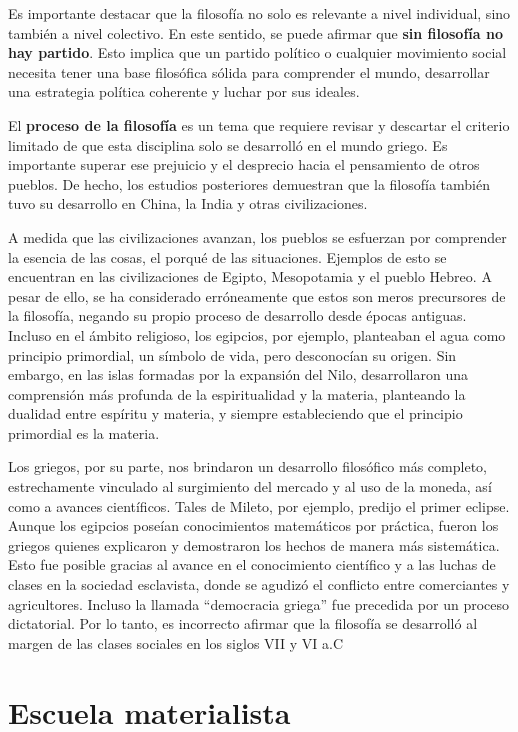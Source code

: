 \documentclass[
  jou,
  floatsintext,
  longtable,
  a4paper,
  nolmodern,
  notxfonts,
  notimes,
  12pt,
  colorlinks=true,linkcolor=blue,citecolor=blue,urlcolor=blue]{apa7}
\begin{document}
Es importante destacar que la filosofía no solo es relevante a nivel
individual, sino también a nivel colectivo. En este sentido, se puede
afirmar que \textbf{sin filosofía no hay partido}. Esto implica que un
partido político o cualquier movimiento social necesita tener una base
filosófica sólida para comprender el mundo, desarrollar una estrategia
política coherente y luchar por sus ideales.

El \textbf{proceso de la filosofía} es un tema que requiere revisar y
descartar el criterio limitado de que esta disciplina solo se desarrolló
en el mundo griego. Es importante superar ese prejuicio y el desprecio
hacia el pensamiento de otros pueblos. De hecho, los estudios
posteriores demuestran que la filosofía también tuvo su desarrollo en
China, la India y otras civilizaciones.

A medida que las civilizaciones avanzan, los pueblos se esfuerzan por
comprender la esencia de las cosas, el porqué de las situaciones.
Ejemplos de esto se encuentran en las civilizaciones de Egipto,
Mesopotamia y el pueblo Hebreo. A pesar de ello, se ha considerado
erróneamente que estos son meros precursores de la filosofía, negando su
propio proceso de desarrollo desde épocas antiguas. Incluso en el ámbito
religioso, los egipcios, por ejemplo, planteaban el agua como principio
primordial, un símbolo de vida, pero desconocían su origen. Sin embargo,
en las islas formadas por la expansión del Nilo, desarrollaron una
comprensión más profunda de la espiritualidad y la materia, planteando
la dualidad entre espíritu y materia, y siempre estableciendo que el
principio primordial es la materia.

Los griegos, por su parte, nos brindaron un desarrollo filosófico más
completo, estrechamente vinculado al surgimiento del mercado y al uso de
la moneda, así como a avances científicos. Tales de Mileto, por ejemplo,
predijo el primer eclipse. Aunque los egipcios poseían conocimientos
matemáticos por práctica, fueron los griegos quienes explicaron y
demostraron los hechos de manera más sistemática. Esto fue posible
gracias al avance en el conocimiento científico y a las luchas de clases
en la sociedad esclavista, donde se agudizó el conflicto entre
comerciantes y agricultores. Incluso la llamada ``democracia griega''
fue precedida por un proceso dictatorial. Por lo tanto, es incorrecto
afirmar que la filosofía se desarrolló al margen de las clases sociales
en los siglos VII y VI a.C

\section{Escuela materialista}\label{escuela-materialista}
\end{document}
